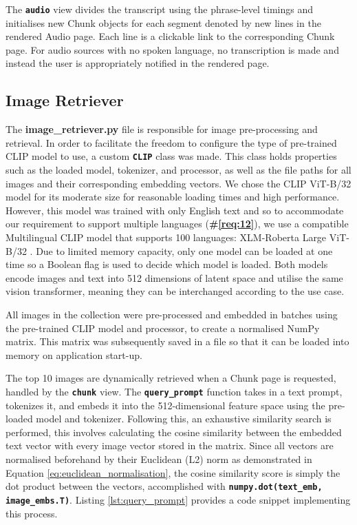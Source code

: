 \documentclass{l4proj}
\begin{document}
The \textbf{\lstinline|audio|} view divides the transcript using the phrase-level timings and initialises new Chunk objects for each segment denoted by new lines in the rendered Audio page. Each line is a clickable link to the corresponding Chunk page. For audio sources with no spoken language, no transcription is made and instead the user is appropriately notified in the rendered page.


\subsection{Image Retriever}
The \textbf{image\_retriever.py} file is responsible for image pre-processing and retrieval. In order to facilitate the freedom to configure the type of pre-trained CLIP model to use, a custom \textbf{\lstinline{CLIP}} class was made. This class holds properties such as the loaded model, tokenizer, and processor, as well as the file paths for all images and their corresponding embedding vectors. We chose the CLIP ViT-B/32 model for its moderate size for reasonable loading times and high performance. However, this model was trained with only English text and so to accommodate our requirement to support multiple languages (\textbf{\#\ref{req:12}}), we use a compatible Multilingual CLIP model that supports 100 languages: XLM-Roberta Large ViT-B/32 \citep{mclip}. Due to limited memory capacity, only one model can be loaded at one time so a Boolean flag is used to decide which model is loaded. Both models encode images and text into 512 dimensions of latent space and utilise the same vision transformer, meaning they can be interchanged according to the use case.

All images in the collection were pre-processed and embedded in batches using the pre-trained CLIP model and processor, to create a normalised NumPy matrix. This matrix was subsequently saved in a file so that it can be loaded into memory on application start-up. 

\label{sec:image_retriever:par:query_prompt}
The top 10 images are dynamically retrieved when a Chunk page is requested, handled by the \textbf{\lstinline{chunk}} view. The \textbf{\lstinline{query_prompt}} function takes in a text prompt, tokenizes it, and embeds it into the 512-dimensional feature space using the pre-loaded model and tokenizer. Following this, an exhaustive similarity search is performed, this involves calculating the cosine similarity between the embedded text vector with every image vector stored in the matrix. Since all vectors are normalised beforehand by their Euclidean (L2) norm as demonstrated in Equation \ref{eq:euclidean_normalisation}, the cosine similarity score is simply the dot product between the vectors, accomplished with \textbf{\lstinline{numpy.dot(text_emb, image_embs.T)}}. Listing \ref{lst:query_prompt} provides a code snippet implementing this process.
\end{document}
